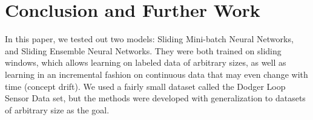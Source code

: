 \documentclass[conference]{IEEEtran}
\begin{document}
		
		
		
		\section{Conclusion and Further Work}
		\label{sec:conclusion}
		
		In this paper, we tested out two models: Sliding Mini-batch Neural Networks,  and Sliding Ensemble Neural Networks. They were both trained on sliding windows, which allows learning on labeled data of arbitrary sizes, as well as learning in an incremental fashion on continuous data that may even change with time (concept drift). We used a fairly small dataset called the Dodger Loop Sensor Data set, but the methods were developed with generalization to datasets of arbitrary size as the goal.
		
\end{document}
